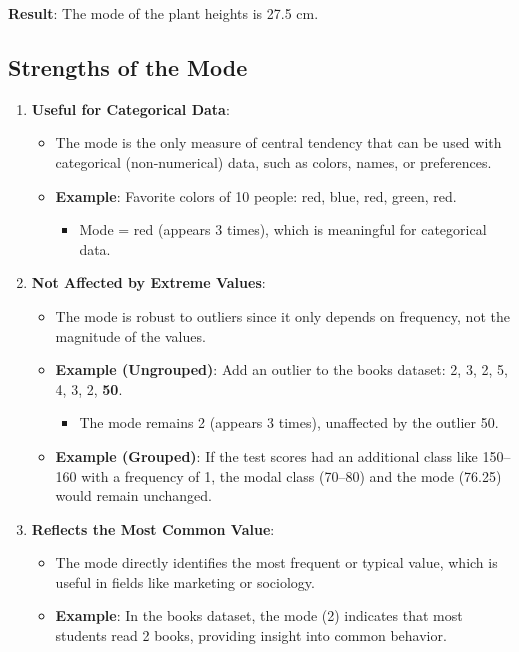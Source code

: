 \documentclass[11pt]{article}
\begin{document}
\textbf{Result}: The mode of the plant heights is 27.5 cm.

\subsection*{Strengths of the Mode}

\begin{enumerate}
    \item \textbf{Useful for Categorical Data}:
    \begin{itemize}
        \item The mode is the only measure of central tendency that can be used with categorical (non-numerical) data, such as colors, names, or preferences.
        \item \textbf{Example}: Favorite colors of 10 people: red, blue, red, green, red.
        \begin{itemize}
            \item Mode = red (appears 3 times), which is meaningful for categorical data.
        \end{itemize}
    \end{itemize}

    \item \textbf{Not Affected by Extreme Values}:
    \begin{itemize}
        \item The mode is robust to outliers since it only depends on frequency, not the magnitude of the values.
        \item \textbf{Example (Ungrouped)}: Add an outlier to the books dataset: 2, 3, 2, 5, 4, 3, 2, \textbf{50}.
        \begin{itemize}
            \item The mode remains 2 (appears 3 times), unaffected by the outlier 50.
        \end{itemize}
        \item \textbf{Example (Grouped)}: If the test scores had an additional class like 150--160 with a frequency of 1, the modal class (70--80) and the mode (76.25) would remain unchanged.
    \end{itemize}

    \item \textbf{Reflects the Most Common Value}:
    \begin{itemize}
        \item The mode directly identifies the most frequent or typical value, which is useful in fields like marketing or sociology.
        \item \textbf{Example}: In the books dataset, the mode (2) indicates that most students read 2 books, providing insight into common behavior.
    \end{itemize}


\end{enumerate}
\end{document}

